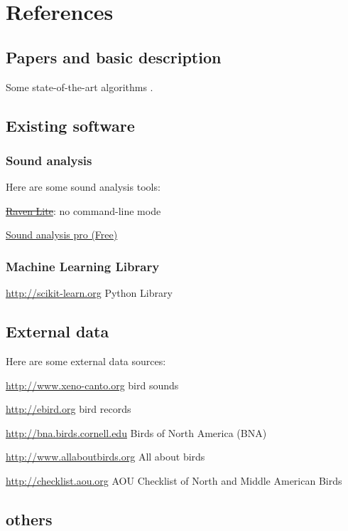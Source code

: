 \section{References}

\subsection{Papers and basic description}

Some state-of-the-art algorithms \cite{briggs2013instance,Lasseck13,Massaron13,stattnersong13}.

\subsection{Existing software}

\subsubsection{Sound analysis}

Here are some sound analysis tools:

\href{http://www.birds.cornell.edu/brp/raven/ravenoverview.html}{\sout{Raven Lite}}: no command-line mode

\href{http://ofer.sci.ccny.cuny.edu/sound_analysis_pro} {Sound analysis pro (Free)}



\subsubsection{Machine Learning Library}

\url{http://scikit-learn.org} Python Library

\subsection{External data}

Here are some external data sources:

\url{http://www.xeno-canto.org} bird sounds

\url{http://ebird.org}  bird records

\url{http://bna.birds.cornell.edu} Birds of North America (BNA) 

\url{http://www.allaboutbirds.org} All about birds

\url{http://checklist.aou.org}       AOU Checklist of North and Middle American Birds


\subsection{others}

